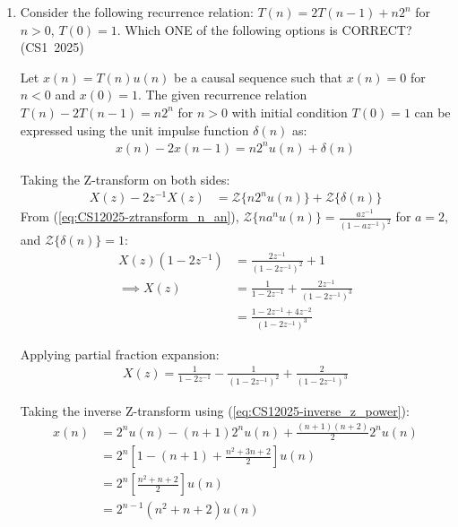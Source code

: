 \begin{enumerate}[label=\thesubsection.\arabic*, ref=\thesubsection.\theenumi]
Therefore, option (b) is correct.

\vspace{0.5cm}
\item Consider the following recurrence relation: $T(n) = 2T(n-1) + n 2^n$ for $n>0$, $T(0)=1$. Which ONE of the following options is CORRECT?
\hfill (CS1~2025)
\begin{enumerate}
	\begin{multicols}{2}
    \item $T(n) = \Theta(n^2 2^n)$
    \item $T(n) = \Theta(n 2^n)$
    \item $T(n) = \Theta((\log n)^2 2^n)$
    \item $T(n) = \Theta(4^n)$
	\end{multicols}
\end{enumerate}

\vspace{0.2cm}
\solution
Let $x(n) = T(n)u(n)$ be a causal sequence such that $x(n) = 0$ for $n < 0$ and $x(0) = 1$. The given recurrence relation $T(n) - 2T(n-1) = n 2^n$ for $n > 0$ with initial condition $T(0) = 1$ can be expressed using the unit impulse function $\delta(n)$ as:
\begin{align}
x(n) - 2x(n-1) = n 2^n u(n) + \delta(n)
\end{align}

Taking the Z-transform on both sides:
\begin{align}
X(z) - 2z^{-1}X(z) &= \mathcal{Z}\{n 2^n u(n)\} + \mathcal{Z}\{\delta(n)\}
\end{align}
From (\ref{eq:CS12025-ztransform_n_an}), $\mathcal{Z}\{n a^n u(n)\} = \frac{a z^{-1}}{(1 - a z^{-1})^2}$ for $a = 2$, and $\mathcal{Z}\{\delta(n)\} = 1$:
\begin{align}
X(z)(1 - 2z^{-1}) &= \frac{2z^{-1}}{(1 - 2z^{-1})^2} + 1 \\
\implies X(z) &= \frac{1}{1 - 2z^{-1}} + \frac{2z^{-1}}{(1 - 2z^{-1})^3} \\
             &= \frac{1 - 2z^{-1} + 4z^{-2}}{(1 - 2z^{-1})^3}
\end{align}

Applying partial fraction expansion:
\begin{align}
X(z) = \frac{1}{1 - 2z^{-1}} - \frac{1}{(1 - 2z^{-1})^2} + \frac{2}{(1 - 2z^{-1})^3}
\end{align}

Taking the inverse Z-transform using (\ref{eq:CS12025-inverse_z_power}):
\begin{align}
x(n) &= 2^n u(n) - (n+1)2^n u(n) + \frac{(n+1)(n+2)}{2} 2^n u(n) \\
     &= 2^n \left[ 1 - (n+1) + \frac{n^2 + 3n + 2}{2} \right] u(n) \\
     &= 2^n \left[ \frac{n^2 + n + 2}{2} \right] u(n) \\
     &= 2^{n-1} (n^2 + n + 2) u(n)
\end{align}


\end{enumerate}
